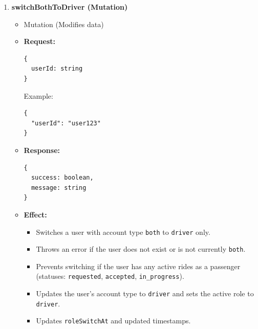 \documentclass[a4paper,12pt]{article}
\begin{document}
\begin{enumerate}
 \item \textbf{switchBothToDriver (Mutation)}
    \begin{itemize}
      \item Mutation (Modifies data)
      \item \textbf{Request:}
      \begin{verbatim}
{
  userId: string
}
      \end{verbatim}
      Example:
      \begin{verbatim}
{
  "userId": "user123"
}
      \end{verbatim}
      \item \textbf{Response:}
      \begin{verbatim}
{
  success: boolean,
  message: string
}
      \end{verbatim}
      \item \textbf{Effect:}
      \begin{itemize}
          \item Switches a user with account type \texttt{both} to \texttt{driver} only.
          \item Throws an error if the user does not exist or is not currently \texttt{both}.
          \item Prevents switching if the user has any active rides as a passenger (statuses: \texttt{requested}, \texttt{accepted}, \texttt{in\_progress}).
          \item Updates the user's account type to \texttt{driver} and sets the active role to \texttt{driver}.
          \item Updates \texttt{roleSwitchAt} and updated timestamps.
        \end{itemize}
    \end{itemize}


\end{enumerate}
\end{document}
